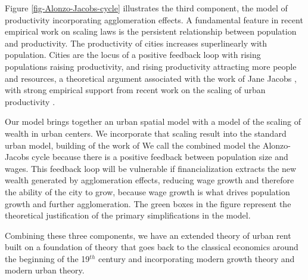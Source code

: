 Figure \ref{fig-Alonzo-Jacobs-cycle} illustrates the third component, the model of productivity incorporating agglomeration effects. %
A fundamental feature in recent empirical work on scaling laws is %
the persistent relationship between population and productivity. The productivity of cities increases superlinearly with population. Cities are the locus of a positive feedback loop with rising populations raising productivity, and rising productivity attracting more people and resources, a theoretical argument associated with the work of Jane Jacobs \cite{jacobsEconomyCities1969}, with strong empirical support from recent work on the scaling of urban productivity  \cite{bettencourtGrowthInnovationScaling2007, bettencourtOriginsScalingCities2013, dongUnderstandingMesoscopicScaling2020, loboUrbanScalingProduction2013}.

Our model brings together an urban spatial model with a model of the scaling of wealth in urban centers. %
We incorporate that scaling result into the standard urban model, building of the work of %
We call the combined model the %
\gls{Alonzo-Jacobs cycle} because there is a positive feedback between population size and wages. This feedback loop will be vulnerable if financialization  extracts the new wealth generated by agglomeration effects, reducing wage growth and therefore the ability of the city to grow, because wage growth is what drives population growth and further agglomeration.
The green boxes in the figure represent the theoretical justification of the primary simplifications in the model. 

Combining these three components, we have an extended theory of urban rent built on a foundation of theory that goes back to the \gls{classical economics} around the beginning of the 19$^{th}$ century and incorporating modern growth theory and modern urban theory. 

